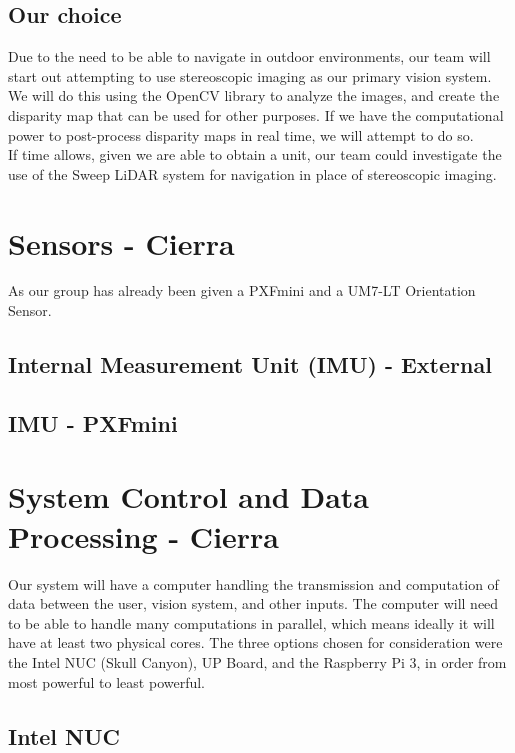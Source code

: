 \documentclass[compsoc,draftclsnofoot,onecolumn,10pt]{IEEEtran}
\begin{document}
\subsection{Our choice}
Due to the need to be able to navigate in outdoor environments, our team will start out attempting to use stereoscopic imaging as our primary vision system. We will do this using the OpenCV library to analyze the images, and create the disparity map that can be used for other purposes. If we have the computational power to post-process disparity maps in real time, we will attempt to do so. \\
If time allows, given we are able to obtain a unit, our team could investigate the use of the Sweep LiDAR system for navigation in place of stereoscopic imaging. 

\section{Sensors - Cierra}
As our group has already been given a PXFmini and a UM7-LT Orientation Sensor. 
\subsection{Internal Measurement Unit (IMU) - External}
\subsection{IMU - PXFmini}


\section{System Control and Data Processing - Cierra}
Our system will have a computer handling the transmission and computation of data between the user, vision system, and other inputs. 
The computer will need to be able to handle many computations in parallel, which means ideally it will have at least two physical cores. 
The three options chosen for consideration were the Intel NUC (Skull Canyon), UP Board, and the Raspberry Pi 3, in order from most powerful to least powerful. 
\subsection{Intel NUC}
\end{document}
